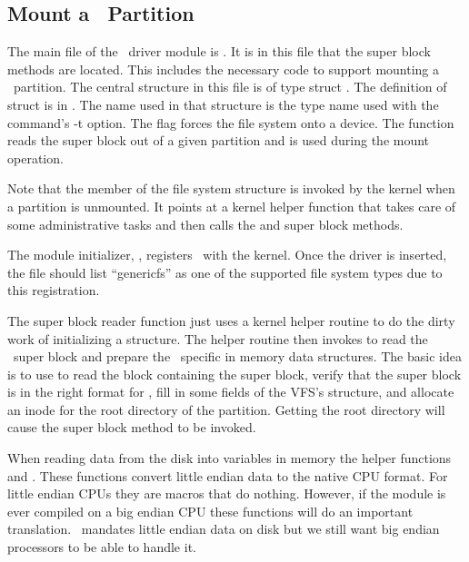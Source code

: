 \subsection{Mount a \GenericFS\ Partition}
\label{sec:implementation-mount}

The main file of the \GenericFS\ driver module is . It is in this file that
the super block methods are located. This includes the necessary code to support mounting a
\GenericFS\ partition. The central structure in this file is  of type struct
. The definition of struct  is in
. The name used in that structure is the type name used with the
 command's -t option. The flag  forces the file system
onto a device. The function  reads the super block out of a given partition
and is used during the mount operation.

Note that the  member of the file system structure is invoked by the kernel when a
partition is unmounted. It points at a kernel helper function that takes care of some
administrative tasks and then calls the  and  super block
methods.

The module initializer, , registers \GenericFS\ with the kernel. Once the
driver is inserted, the file  should list ``genericfs'' as one of
the supported file system types due to this registration.

The super block reader function just uses a kernel helper routine to do the dirty work of
initializing a  structure. The helper routine then invokes
 to read the \GenericFS\ super block and prepare the \GenericFS\ specific
in memory data structures. The basic idea is to use  to read the block containing
the super block, verify that the super block is in the right format for \GenericFS, fill in some
fields of the VFS's  structure, and allocate an inode for the root directory
of the partition. Getting the root directory will cause the  super block method
to be invoked.

When reading data from the disk into variables in memory the helper functions 
and . These functions convert little endian data to the native CPU format. For
little endian CPUs they are macros that do nothing. However, if the module is ever compiled on a
big endian CPU these functions will do an important translation. \GenericFS\ mandates little
endian data on disk but we still want big endian processors to be able to handle it.

